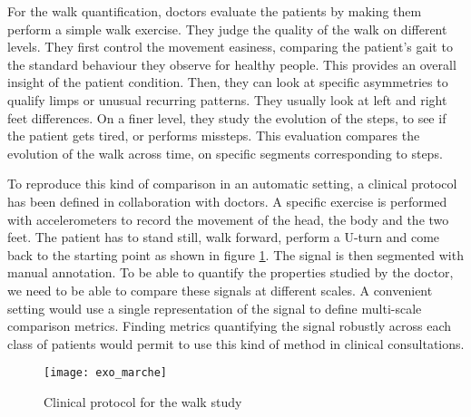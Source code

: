 \documentclass[../thesis.tex]{subfiles}
\begin{document}
For the walk quantification, doctors evaluate the patients by making them perform a simple walk exercise. They judge the quality of the walk on different levels. They first control the movement easiness, comparing the patient's gait to the standard behaviour they observe for healthy people. This provides an overall insight of the patient condition. Then, they can look at specific asymmetries to qualify limps or unusual recurring patterns. They usually look at left and right feet differences. On a finer level, they study the evolution of the steps, to see if the patient gets tired, or performs missteps. This evaluation compares the evolution of the walk across time, on specific segments corresponding to steps.

To reproduce this kind of comparison in an automatic setting, a clinical protocol has been defined in collaboration with doctors. A specific exercise is performed with accelerometers to record the movement of the head, the body and the two feet. The patient has to stand still, walk forward, perform a U-turn and come back to the starting point as shown in figure \ref{exo}. The signal is then segmented with manual annotation. To be able to quantify the properties studied by the doctor, we need to be able to compare these signals at different scales. A convenient setting would use a single representation of the signal to define multi-scale comparison metrics. Finding metrics quantifying the signal robustly across each class of patients would permit to use this kind of method in clinical consultations.

\begin{figure}[htp]
\centering
\texttt{[image: exo\_marche]}
\caption{Clinical protocol for the walk study}
\label{exo}
\end{figure}





\biblio{}
\end{document}
